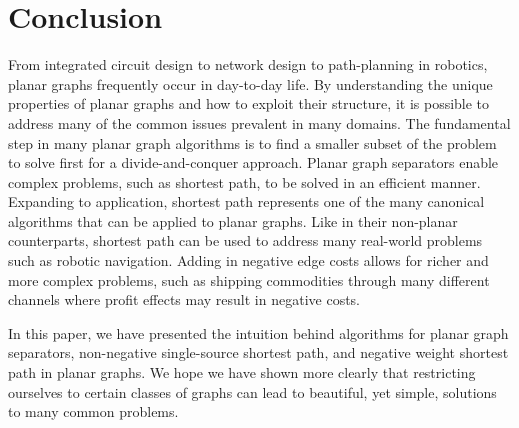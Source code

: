\documentclass[11pt]{article}
\begin{document}
\section{Conclusion}
\label{sec:conclusion}

From integrated circuit design to network design to path-planning in robotics, planar graphs frequently occur in day-to-day life. By understanding the unique properties of planar graphs and how to exploit their structure, it is possible to address many of the common issues prevalent in many domains. The fundamental step in many planar graph algorithms is to find a smaller subset of the problem to solve first for a divide-and-conquer approach. Planar graph separators enable complex problems, such as shortest path, to be solved in an efficient manner. Expanding to application, shortest path represents one of the many canonical algorithms that can be applied to planar graphs. Like in their non-planar counterparts, shortest path can be used to address many real-world problems such as robotic navigation. Adding in negative edge costs allows for richer and more complex problems, such as shipping commodities through many different channels where profit effects may result in negative costs.

In this paper, we have presented the intuition behind algorithms for planar graph separators, non-negative single-source shortest path, and negative weight shortest path in planar graphs. We hope we have shown more clearly that restricting ourselves to certain classes of graphs can lead to beautiful, yet simple, solutions to many common problems.



\end{document}
